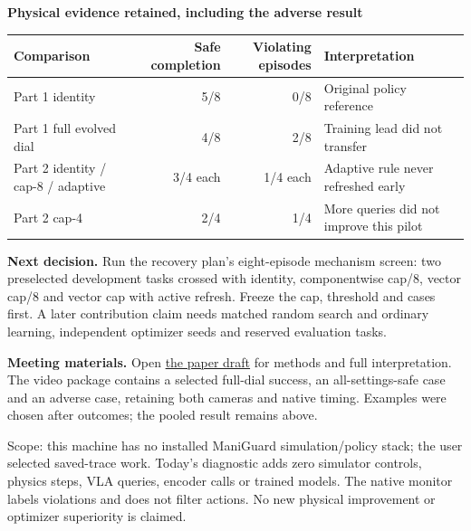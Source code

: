 \documentclass[11pt,a4paper]{article}
\begin{document}
\vspace{2mm}
\textbf{Physical evidence retained, including the adverse result}\par
\begin{center}
\footnotesize
\begin{tabular}{lrrl}
\toprule
Comparison & Safe completion & Violating episodes & Interpretation \\
\midrule
Part 1 identity & 5/8 & 0/8 & Original policy reference \\
Part 1 full evolved dial & 4/8 & 2/8 & Training lead did not transfer \\
Part 2 identity / cap-8 / adaptive & 3/4 each & 1/4 each & Adaptive rule never refreshed early \\
Part 2 cap-4 & 2/4 & 1/4 & More queries did not improve this pilot \\
\bottomrule
\end{tabular}
\end{center}
\vspace{-2mm}
\textbf{Next decision.} Run the recovery plan's eight-episode mechanism screen:
two preselected development tasks crossed with identity, componentwise cap/8,
vector cap/8 and vector cap with active refresh. Freeze the cap, threshold and
cases first. A later contribution claim needs matched random search and ordinary
learning, independent optimizer seeds and reserved evaluation tasks.

\textbf{Meeting materials.} Open \href{supervisor-draft.pdf}{the paper draft} for
methods and full interpretation. The video package contains a selected full-dial
success, an all-settings-safe case and an adverse case, retaining both cameras and
native timing. Examples were chosen after outcomes; the pooled result remains above.

{\footnotesize\color{muted}
Scope: this machine has no installed ManiGuard simulation/policy stack; the user
selected saved-trace work. Today's diagnostic adds zero simulator controls, physics
steps, VLA queries, encoder calls or trained models. The native monitor labels
violations and does not filter actions. No new physical improvement or optimizer
superiority is claimed.}
\end{document}
